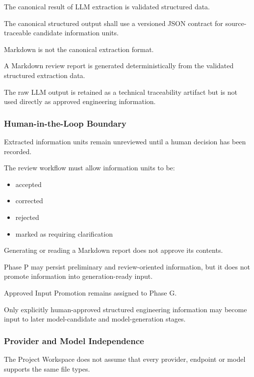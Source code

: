 The canonical result of LLM extraction is validated structured data.

The canonical structured output shall use a versioned JSON contract for source-traceable candidate information units.

Markdown is not the canonical extraction format.

A Markdown review report is generated deterministically from the validated structured extraction data.

The raw LLM output is retained as a technical traceability artifact but is not used directly as approved engineering information.

\hypertarget{human-in-the-loop-boundary}{%
\subsubsection{Human-in-the-Loop Boundary}\label{human-in-the-loop-boundary}}

Extracted information units remain unreviewed until a human decision has been recorded.

The review workflow must allow information units to be:

\begin{itemize}
\tightlist
\item
  accepted
\item
  corrected
\item
  rejected
\item
  marked as requiring clarification
\end{itemize}

Generating or reading a Markdown report does not approve its contents.

Phase P may persist preliminary and review-oriented information, but it does not promote information into generation-ready input.

Approved Input Promotion remains assigned to Phase G.

Only explicitly human-approved structured engineering information may become input to later model-candidate and model-generation stages.

\hypertarget{provider-and-model-independence}{%
\subsubsection{Provider and Model Independence}\label{provider-and-model-independence}}

The Project Workspace does not assume that every provider, endpoint or model supports the same file types.


